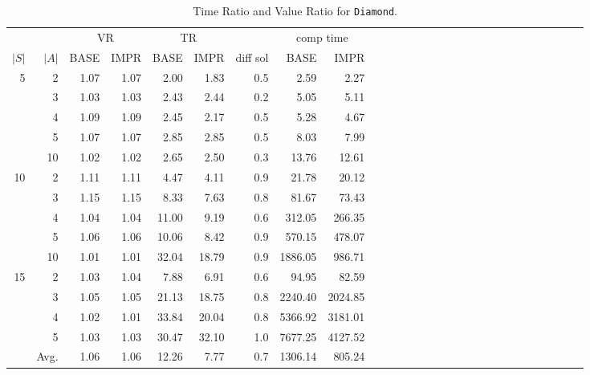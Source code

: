 \begin{center}
\begin{table} %
 \setlength{\tabcolsep}{2.5pt}
 \renewcommand \arraystretch{1.3}
\begin{tabular}{rrrrrrrrrrrrrrrrrrrrrrrrrrrr}
	&		&	\multicolumn{2}{c}{	VR	}	&	\multicolumn{2}{c}{	TR	}	&				&	\multicolumn{2}{c}{	comp time	}	\\
$|S|$	&	$|A|$	&	BASE	&	IMPR	&	BASE	&	IMPR	&		diff sol		&	BASE	&	IMPR	\\
\cmidrule(lr){1-2}				\cmidrule(lr){3-4}				\cmidrule(lr){5-6}								\cmidrule(lr){15-16}			
5	&	2	&	1.07	&	1.07	&	2.00	&	1.83	&			0.5	&	2.59	&	2.27	\\
	&	3	&	1.03	&	1.03	&	2.43	&	2.44	&			0.2	&	5.05	&	5.11	\\
	&	4	&	1.09	&	1.09	&	2.45	&	2.17	&			0.5	&	5.28	&	4.67	\\
	&	5	&	1.07	&	1.07	&	2.85	&	2.85	&			0.5	&	8.03	&	7.99	\\
	&	10	&	1.02	&	1.02	&	2.65	&	2.50	&			0.3	&	13.76	&	12.61	\\
10	&	2	&	1.11	&	1.11	&	4.47	&	4.11	&			0.9	&	21.78	&	20.12	\\
	&	3	&	1.15	&	1.15	&	8.33	&	7.63	&			0.8	&	81.67	&	73.43	\\
	&	4	&	1.04	&	1.04	&	11.00	&	9.19	&			0.6	&	312.05	&	266.35	\\
	&	5	&	1.06	&	1.06	&	10.06	&	8.42	&			0.9	&	570.15	&	478.07	\\
	&	10	&	1.01	&	1.01	&	32.04	&	18.79	&			0.9	&	1886.05	&	986.71	\\
15	&	2	&	1.03	&	1.04	&	7.88	&	6.91	&			0.6	&	94.95	&	82.59	\\
	&	3	&	1.05	&	1.05	&	21.13	&	18.75	&			0.8	&	2240.40	&	2024.85	\\
	&	4	&	1.02	&	1.01	&	33.84	&	20.04	&			0.8	&	5366.92	&	3181.01	\\
	&	5	&	1.03	&	1.03	&	30.47	&	32.10	&			1.0	&	7677.25	&	4127.52	\\
	&	Avg.	&	1.06	&	1.06	&	12.26	&	7.77	&			0.7	&	1306.14	&	805.24	
\end{tabular}						
\caption{Time Ratio and Value Ratio for \texttt{Diamond}.}														\label{tab:diamond}								
\end{table} %
\end{center}